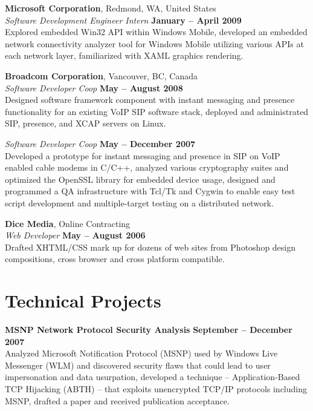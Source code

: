 \documentclass[margin,line]{resume}
\begin{document}
\begin{resume}
    \textbf{Microsoft Corporation}, Redmond, WA, United States \vspace{2mm}\\\vspace{1mm}%
    \textsl{Software Development Engineer Intern} \hfill \textbf{January -- April 2009}\\
    Explored embedded Win32 API within Windows Mobile,
    developed an embedded network connectivity analyzer tool for Windows Mobile utilizing various APIs at each network layer,
    familiarized with XAML graphics rendering.

    \textbf{Broadcom Corporation}, Vancouver, BC, Canada \vspace{2mm}\\\vspace{1mm}%
    \textsl{Software Developer Coop} \hfill \textbf{May -- August 2008}\\
    Designed software framework component with instant messaging and presence functionality for an existing VoIP SIP software stack,
    deployed and administrated SIP, presence, and XCAP servers on Linux.

    \textsl{Software Developer Coop} \hfill \textbf{May -- December 2007}\\
    Developed a prototype for instant messaging and presence in SIP on VoIP enabled cable modems in C/C++,
    analyzed various cryptography suites and optimized the OpenSSL library for embedded device usage,
    designed and programmed a QA infrastructure with Tcl/Tk and Cygwin to enable easy test script development and multiple-target testing on a distributed network.

    \textbf{Dice Media}, Online Contracting \vspace{2mm}\\\vspace{1mm}%
    \textsl{Web Developer} \hfill \textbf{May -- August 2006}\\
    Drafted XHTML/CSS mark up for dozens of web sites from Photoshop design compositions, cross browser and cross platform compatible.

    \section{\mysidestyle Technical Projects}
    \textbf{MSNP Network Protocol Security Analysis} \hfill \textbf{September -- December 2007} \vspace{2mm}\\\vspace{1mm}%
    Analyzed Microsoft Notification Protocol (MSNP) used by Windows Live Messenger (WLM) and discovered security flaws that could lead to user impersonation and data usurpation,
    developed a technique -- Application-Based TCP Hijacking (ABTH) -- that exploits unencrypted TCP/IP protocols including MSNP,
    drafted a paper and received publication acceptance.


\end{resume}
\end{document}
